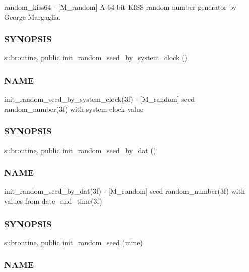\begin{DoxyCompactItemize}
\begin{DoxyCompactList}
random\+\_\+kiss64 -\/ \mbox{[}M\+\_\+random\mbox{]} A 64-\/bit K\+I\+SS random number generator by George Margaglia. \subsubsection*{S\+Y\+N\+O\+P\+S\+IS}\end{DoxyCompactList}\item 
\hyperlink{M__stopwatch_83_8txt_acfbcff50169d691ff02d4a123ed70482}{subroutine}, \hyperlink{M__stopwatch_83_8txt_a2f74811300c361e53b430611a7d1769f}{public} \hyperlink{namespacem__random_a887216bea7a75b314e538afd3ebe2ff3}{init\+\_\+random\+\_\+seed\+\_\+by\+\_\+system\+\_\+clock} ()
\begin{DoxyCompactList}\small\item\em \subsubsection*{N\+A\+ME}

init\+\_\+random\+\_\+seed\+\_\+by\+\_\+system\+\_\+clock(3f) -\/ \mbox{[}M\+\_\+random\mbox{]} seed random\+\_\+number(3f) with system clock value \subsubsection*{S\+Y\+N\+O\+P\+S\+IS}\end{DoxyCompactList}\item 
\hyperlink{M__stopwatch_83_8txt_acfbcff50169d691ff02d4a123ed70482}{subroutine}, \hyperlink{M__stopwatch_83_8txt_a2f74811300c361e53b430611a7d1769f}{public} \hyperlink{namespacem__random_a6e3975f994c77778043f3e5d00614317}{init\+\_\+random\+\_\+seed\+\_\+by\+\_\+dat} ()
\begin{DoxyCompactList}\small\item\em \subsubsection*{N\+A\+ME}

init\+\_\+random\+\_\+seed\+\_\+by\+\_\+dat(3f) -\/ \mbox{[}M\+\_\+random\mbox{]} seed random\+\_\+number(3f) with values from date\+\_\+and\+\_\+time(3f) \subsubsection*{S\+Y\+N\+O\+P\+S\+IS}\end{DoxyCompactList}\item 
\hyperlink{M__stopwatch_83_8txt_acfbcff50169d691ff02d4a123ed70482}{subroutine}, \hyperlink{M__stopwatch_83_8txt_a2f74811300c361e53b430611a7d1769f}{public} \hyperlink{namespacem__random_af867f4abf9b4006b89e0ca160fc1b61a}{init\+\_\+random\+\_\+seed} (mine)
\begin{DoxyCompactList}\small\item\em \subsubsection*{N\+A\+ME}


\end{DoxyCompactList}
\end{DoxyCompactItemize}
